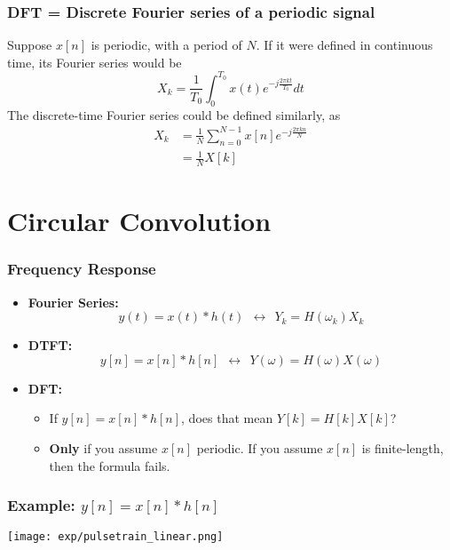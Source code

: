 \documentclass{beamer}
\begin{document}
\begin{frame}
  \frametitle{DFT = Discrete Fourier series of a periodic signal}

  Suppose $x[n]$ is periodic, with a period of $N$.  If it were
  defined in continuous time, its Fourier series would be
  \begin{displaymath}
    X_k=\frac{1}{T_0}\int_0^{T_0}x(t)e^{-j\frac{2\pi kt}{T_0}}dt
  \end{displaymath}
  The discrete-time Fourier series could be defined similarly, as
  \begin{align*}
    X_k &=\frac{1}{N}\sum_{n=0}^{N-1} x[n]e^{-j\frac{2\pi kn}{N}}\\
    &=\frac{1}{N}X[k]
  \end{align*}
\end{frame}

\section[Convolution]{Circular Convolution}
\setcounter{subsection}{1}

\begin{frame}
  \frametitle{Frequency Response}
  \begin{itemize}
  \item {\bf Fourier Series:}
    \begin{displaymath}
      y(t)=x(t)\ast h(t)~~\leftrightarrow~~
      Y_k = H(\omega_k) X_k
    \end{displaymath}
  \item {\bf DTFT:}
    \begin{displaymath}
      y[n]=x[n]\ast h[n]~~\leftrightarrow~~
      Y(\omega) = H(\omega)X(\omega)
    \end{displaymath}
  \item {\bf DFT:}
    \begin{itemize}
    \item If $y[n]=x[n]\ast h[n]$, does that mean $Y[k] = H[k]X[k]$?
    \item {\bf Only} if you assume $x[n]$ periodic.  If you assume $x[n]$
      is finite-length, then the formula fails.
    \end{itemize}
  \end{itemize}
\end{frame}

\begin{frame}
  \frametitle{Example: $y[n]=x[n]\ast h[n]$}

  \centerline{\texttt{[image: exp/pulsetrain\_linear.png]}}
\end{frame}
\end{document}
